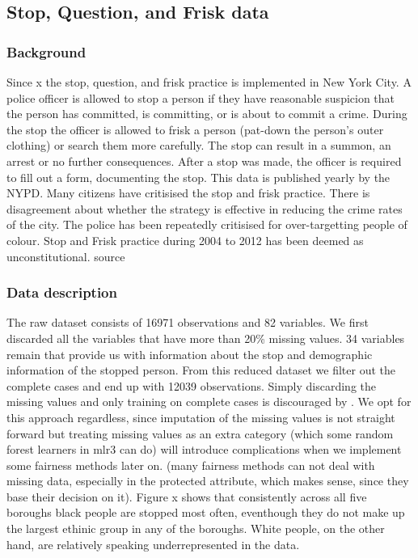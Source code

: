 \subsection*{Stop, Question, and Frisk data}
\subsubsection*{Background}
Since x the stop, question, and frisk practice is implemented in New York City. A police officer is allowed to stop a person if they have reasonable suspicion that the person has committed, is committing, or is about to commit a crime.
During the stop the officer is allowed to frisk a person (pat-down the person's outer clothing) or search them more carefully.
The stop can result in a summon, an arrest or no further consequences. After a stop was made, the officer is required to fill out a form, documenting the stop. This data is published yearly by the NYPD.
Many citizens have critisised the stop and frisk practice. There is disagreement about whether the strategy is effective in reducing the crime rates of the city. The police has been repeatedly critisised for over-targetting people of colour.
Stop and Frisk practice during 2004 to 2012 has been deemed as unconstitutional. {\color{red} source}

\subsubsection*{Data description}
The raw dataset consists of 16971 observations and 82 variables. We first discarded all the variables that have more than 20\% missing values.
34 variables remain that provide us with information about the stop and demographic information of the stopped person. From this reduced dataset we filter out the complete cases and end up with 12039 observations.
Simply discarding the missing values and only training on complete cases is discouraged by \cite{fernando2021}. We opt for this approach regardless, since imputation of the missing values is not straight forward
but treating missing values as an extra category (which some random forest learners in mlr3 can do) will introduce complications when we implement some fairness methods later on.
(many fairness methods can not deal with missing data, especially in the protected attribute, which makes sense, since they base their decision on it). 
Figure x {\color{red}{combine the two race distribution by borough plots}} shows that consistently across all five boroughs black people are stopped most often, eventhough they do not make up the largest ethinic group in any of the boroughs. White people, on the other hand, are relatively speaking underrepresented in the data.


